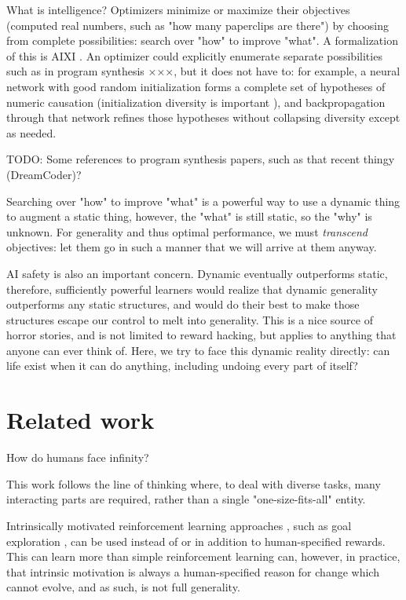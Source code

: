\documentclass{article}
\begin{document}
What is intelligence? Optimizers minimize or maximize their objectives (computed real numbers, such as "how many paperclips are there") by choosing from complete possibilities: search over "how" to improve "what". A formalization of this is AIXI \cite{DBLP:journals/corr/cs-AI-0004001}. An optimizer could explicitly enumerate separate possibilities such as in program synthesis ×××, but it does not have to: for example, a neural network with good random initialization forms a complete set of hypotheses of numeric causation (initialization diversity is important \cite{mellor2021neural}), and backpropagation through that network refines those hypotheses without collapsing diversity except as needed.

        TODO: Some references to program synthesis papers, such as that recent thingy (DreamCoder)?

Searching over "how" to improve "what" is a powerful way to use a dynamic thing to augment a static thing, however, the "what" is still static, so the "why" is unknown. For generality and thus optimal performance, we must \textit{transcend} objectives: let them go in such a manner that we will arrive at them anyway.

AI safety is also an important concern. Dynamic eventually outperforms static, therefore, sufficiently powerful learners would realize that dynamic generality outperforms any static structures, and would do their best to make those structures escape our control to melt into generality. This is a nice source of horror stories, and is not limited to reward hacking, but applies to anything that anyone can ever think of. Here, we try to face this dynamic reality directly: can life exist when it can do anything, including undoing every part of itself?

\section{Related work}

How do humans face infinity?

This work follows the line of thinking \cite{10.5555/22939} \cite{fodor1983modularity} where, to deal with diverse tasks, many interacting parts are required, rather than a single "one-size-fits-all" entity.

Intrinsically motivated reinforcement learning approaches \cite{6294131}, such as goal exploration \cite{DBLP:journals/corr/abs-1708-02190}, can be used instead of or in addition to human-specified rewards. This can learn more than simple reinforcement learning can, however, in practice, that intrinsic motivation is always a human-specified reason for change which cannot evolve, and as such, is not full generality.
\end{document}
